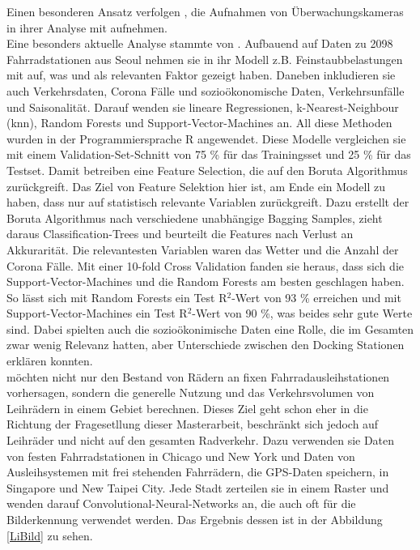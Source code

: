 \documentclass[a4paper,12pt]{thesis}
\begin{document}
Einen besonderen Ansatz verfolgen \cite{Colace2020}, die Aufnahmen von Überwachungskameras in ihrer Analyse mit aufnehmen.\\
Eine besonders aktuelle Analyse stammte von \cite{Gao2022}. Aufbauend auf Daten zu 2098 Fahrradstationen aus Seoul nehmen sie in ihr Modell z.B. Feinstaubbelastungen mit auf, was \cite{Hong2022} und \cite{ZHAO2018826} als relevanten Faktor gezeigt haben. Daneben inkludieren sie auch Verkehrsdaten, Corona Fälle und sozioökonomische Daten, Verkehrsunfälle und Saisonalität. Darauf wenden sie lineare Regressionen, k-Nearest-Neighbour (knn), Random Forests und Support-Vector-Machines an. All diese Methoden wurden in der Programmiersprache R angewendet. Diese Modelle vergleichen sie mit einem Validation-Set-Schnitt von 75 \% für das Trainingsset und 25 \% für das Testset. Damit betreiben \cite{Gao2022} eine Feature Selection, die auf den Boruta Algorithmus zurückgreift. Das Ziel von Feature Selektion hier ist, am Ende ein Modell zu haben, dass nur auf statistisch relevante Variablen zurückgreift. Dazu erstellt der Boruta Algorithmus nach \cite{Kursa2010} verschiedene unabhängige Bagging Samples, zieht daraus Classification-Trees und beurteilt die Features nach Verlust an Akkurarität. Die relevantesten Variablen waren das Wetter und die Anzahl der Corona Fälle. Mit einer 10-fold Cross Validation fanden sie heraus, dass sich die Support-Vector-Machines und die Random Forests am besten geschlagen haben. So lässt sich mit Random Forests ein Test R$^2$-Wert von 93 \% erreichen und mit Support-Vector-Machines ein Test R$^2$-Wert von 90 \%, was beides sehr gute Werte sind. Dabei spielten auch die sozioökonimische Daten eine Rolle, die im Gesamten zwar wenig Relevanz hatten, aber Unterschiede zwischen den Docking Stationen erklären konnten.\\ 
\cite{Li2022} möchten nicht nur den Bestand von Rädern an fixen Fahrradausleihstationen vorhersagen, sondern die generelle Nutzung und das Verkehrsvolumen von Leihrädern in einem Gebiet berechnen. Dieses Ziel geht schon eher in die Richtung der Fragesetllung dieser Masterarbeit, beschränkt sich jedoch auf Leihräder und nicht auf den gesamten Radverkehr. Dazu verwenden sie Daten von festen Fahrradstationen in Chicago und New York und Daten von Ausleihsystemen mit frei stehenden Fahrrädern, die GPS-Daten speichern, in Singapore und New Taipei City. Jede Stadt zerteilen sie in einem Raster und wenden darauf Convolutional-Neural-Networks an, die auch oft für die Bilderkennung verwendet werden. Das Ergebnis dessen ist in der Abbildung \ref{LiBild} zu sehen.\\
\end{document}

